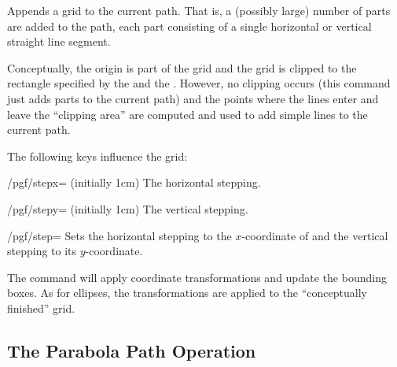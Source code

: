 \begin{command}{\pgfpathgrid{}}
  Appends a grid to the current path. That is, a (possibly large)
  number of parts are added to the path, each part consisting of a
  single horizontal or vertical straight line segment.

  Conceptually, the origin is part of the grid and the grid is clipped
  to the rectangle specified by the  and
  the . However, no clipping occurs (this
  command just adds parts to the current path) and the points
  where the lines enter and leave the ``clipping area'' are computed
  and used to add simple lines to the current path.

  The following keys influence the grid:
  \begin{key}{/pgf/stepx= (initially 1cm)}
    The horizontal stepping.
  \end{key}
  \begin{key}{/pgf/stepy= (initially 1cm)}
    The vertical stepping.
  \end{key}
  \begin{key}{/pgf/step=}
    Sets the horizontal stepping to the $x$-coordinate of
     and the vertical stepping to its $y$-coordinate.
  \end{key}
\begin{codeexample}[]
\begin{pgfpicture}
  \pgfsetlinewidth{0.8pt}
  \pgfpathgrid[step={\pgfpoint{1cm}{1cm}}]
    {\pgfpoint{-3mm}{-3mm}}{\pgfpoint{33mm}{23mm}}
  \pgfsetlinewidth{0.4pt}
  \pgfpathgrid[stepx=1mm,stepy=1mm]
    {\pgfpoint{-1.5mm}{-1.5mm}}{\pgfpoint{31.5mm}{21.5mm}}
\end{pgfpicture}
\end{codeexample}
  The command will apply coordinate transformations and update the
  bounding boxes. As for ellipses, the transformations are
  applied to the ``conceptually finished'' grid.
\begin{codeexample}[]
\begin{pgfpicture}
  \pgfpathgrid[stepx=1mm,stepy=2mm]{\pgfpoint{0mm}{0mm}}{\pgfpoint{30mm}{30mm}}
\end{pgfpicture}
\end{codeexample}
\end{command}


\subsection{The Parabola Path Operation}

